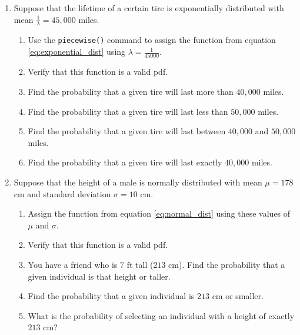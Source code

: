 \begin{enumerate}
\item Suppose that the lifetime of a certain tire is exponentially distributed with mean $\frac{1}{\lambda}=45,000$ miles.
\begin{enumerate}
	\item Use the \texttt{piecewise()} command to assign the function from equation \eqref{eq:exponential_dist} using $\lambda = \frac{1}{45000}$.
	\item Verify that this function is a valid pdf.
	\item Find the probability that a given tire will last more than $40{,}000$ miles.
	\item Find the probability that a given tire will last less than $50{,}000$ miles.
	\item Find the probability that a given tire will last between $40{,}000$ and $50{,}000$ miles.
	\item Find the probability that a given tire will last exactly $40{,}000$ miles.
\end{enumerate}
\item Suppose that the height of a male is normally distributed with mean $\mu= 178$ cm and standard deviation  $\sigma= 10$ cm.
\begin{enumerate}
    \item Assign the function from equation \eqref{eq:normal_dist} using these values of $\mu$ and $\sigma$.
    \item Verify that this function is a valid pdf.
    \item You have a friend who is $7$ ft tall ($213$ cm). Find the probability that a given individual is that height or taller.
    \item Find the probability that a given individual is $213$ cm or smaller.
    \item What is the probability of selecting an individual with a height of exactly $213$ cm?
\end{enumerate}

\end{enumerate}